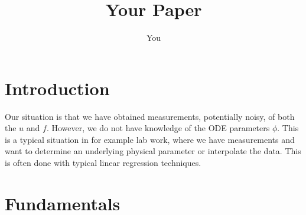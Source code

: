 \documentclass{article}
\title{Your Paper}
\author{You}
\begin{document}
\maketitle

\newpage
\begin{abstract}

\end{abstract}

\section{Introduction}
Our situation is that we have obtained measurements, potentially noisy, of both the $u$ and $f$. However, we do not have knowledge of the ODE parameters $\phi$. This is a typical situation in for example lab work, where we have measurements and want to determine an underlying physical parameter or interpolate the data. This is often done with typical linear regression techniques. 
\section{Fundamentals}
\end{document}
